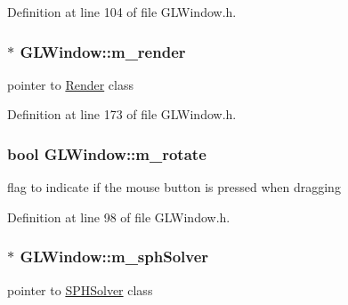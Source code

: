 Definition at line 104 of file GLWindow.h.

\hypertarget{class_g_l_window_a165764f9295fafbca46560937898c839}{
\subsubsection[{m\_\-render}]{$\ast$ {\bf GLWindow::m\_\-render}}}
\label{class_g_l_window_a165764f9295fafbca46560937898c839}


pointer to \hyperlink{class_render}{Render} class 



Definition at line 173 of file GLWindow.h.

\hypertarget{class_g_l_window_a1b5d8b223995bc9740074c5342fe8e38}{
\subsubsection[{m\_\-rotate}]{\setlength{\rightskip}{0pt plus 5cm}bool {\bf GLWindow::m\_\-rotate}}}
\label{class_g_l_window_a1b5d8b223995bc9740074c5342fe8e38}


flag to indicate if the mouse button is pressed when dragging 



Definition at line 98 of file GLWindow.h.

\hypertarget{class_g_l_window_a0176eab25515853a18867ca37578ee3b}{
\subsubsection[{m\_\-sphSolver}]{$\ast$ {\bf GLWindow::m\_\-sphSolver}}}
\label{class_g_l_window_a0176eab25515853a18867ca37578ee3b}


pointer to \hyperlink{class_s_p_h_solver}{SPHSolver} class 



